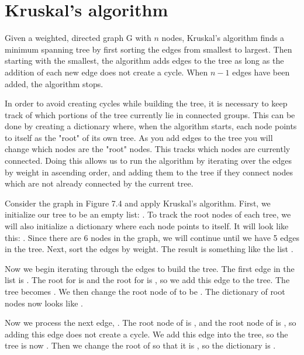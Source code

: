\section*{Kruskal's algorithm}

Given a weighted, directed graph G with $n$ nodes, Kruskal's algorithm finds a minimum spanning tree by first sorting the edges from smallest to largest.
Then starting with the smallest, the algorithm adds edges to the tree as long as the addition of each new edge does not create a cycle.
When $n-1$ edges have been added, the algorithm stops.

In order to avoid creating cycles while building the tree, it is necessary to keep track of which portions of the tree currently lie in connected groups.
This can be done by creating a dictionary where, when the algorithm starts, each node points to itself as the "root" of its own tree.
As you add edges to the tree you will change which nodes are the "root" nodes. This tracks which nodes are currently connected.
Doing this allows us to run the algorithm by iterating over the edges by weight in ascending order, and adding them to the tree if they connect nodes which are not already connected by the current tree.

Consider the graph in Figure 7.4 and apply Kruskal's algorithm.
First, we initialize our tree to be an empty list: \li{[]}.
To track the root nodes of each tree, we will also initialize a dictionary where each node points to itself.
It will look like this: .
Since there are 6 nodes in the graph, we will continue until we have 5 edges in the tree.
Next, sort the edges by weight.
The result is something like the list \li{[(C, D, 1), (C, E, 1), (D, E, 2), (A, B, 3), (B, F, 4), (E, F, 4), (B, C, 5), (C, F, 5), (A, F, 6)]}.

Now we begin iterating through the edges to build the tree.
The first edge in the list is .
The root for  is  and the root for  is , so we add this edge to the tree.
The tree becomes \li{[(C, D, 1)]}.
We then change the root node of  to be .
The dictionary of root nodes now looks like .

Now we process the next edge, .
The root node of  is , and the root node of  is , so adding this edge does not create a cycle.
We add this edge into the tree, so the tree is now \li{[(C, D, 1), (C, E, 1)]}.
Then we change the root of  so that it is , so the dictionary is .

